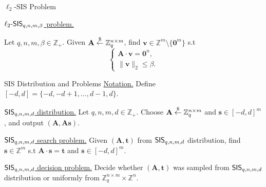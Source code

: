 \begin{frame}{$\ell_2$-SIS Problem}
	
	\underline{$\ell_2\textsf{-SIS}_{q, n, m, \beta}$ problem.}
	
	Let $q,n, m, \beta \in \mathbb{Z}_+$. Given $\mathbf{A} \stackrel{\$}{\leftarrow} \mathbb{Z}_q^{n\times m}$, find $\mathbf{v} \in \mathbb{Z}^m \setminus \{\mathbf{0}^m\}$ s.t 
	\begin{equation*}
		\begin{cases}
			\mathbf{A}\cdot\mathbf{v} = \mathbf{0}^n,\\
			\lVert\mathbf{v}\rVert_2 \leq \beta.
		\end{cases}
	\end{equation*}
\end{frame}

\begin{frame}{SIS Distribution and Problems}
	\underline{Notation.} Define $[-d, d] = \{-d, -d + 1, \dots, d - 1, d\}$.
	
	\underline{$\textsf{SIS}_{q,n,m,d}$ distribution.} Let $q, n, m, d \in \mathbb{Z}_+$. Choose $\mathbf{A} \stackrel{\$}{\leftarrow} \mathbb{Z}_q^{n\times m}$ and $\mathbf{s} \in [-d, d]^m$, and output $(\mathbf{A}, \mathbf{A}\mathbf{s})$.
	
	\underline{$\textsf{SIS}_{q, n, m, d}$ search problem.} Given $(\mathbf{A}, \mathbf{t})$ from $\textsf{SIS}_{q, n, m, d}$ distribution, find $\mathbf{s} \in \mathbb{Z}^m$ s.t 
	$\mathbf{A}\cdot\mathbf{s} = \mathbf{t}$ and $\mathbf{s} \in [-d, d]^m$.
	
	\underline{$\textsf{SIS}_{q, n, m, d}$ decision problem.} Decide whether $(\mathbf{A}, \mathbf{t})$ was sampled from $\textsf{SIS}_{q, n, m, d}$ distribution or uniformly from $\mathbb{Z}_q^{n\times m} \times \mathbb{Z}^n$.
\end{frame}